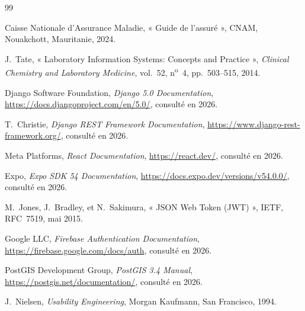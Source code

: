 \documentclass[12pt, a4paper, oneside]{report}
\begin{document}
\begin{thebibliography}{99}

  Caisse Nationale d'Assurance Maladie, « Guide de l'assuré », CNAM,
  Nouakchott, Mauritanie, 2024.

  J.\ Tate, « Laboratory Information Systems: Concepts and Practice »,
  \emph{Clinical Chemistry and Laboratory Medicine}, vol.~52, n\textsuperscript{o}~4,
  pp.~503--515, 2014.

  Django Software Foundation, \emph{Django 5.0 Documentation},
  \url{https://docs.djangoproject.com/en/5.0/}, consulté en 2026.

  T.\ Christie, \emph{Django REST Framework Documentation},
  \url{https://www.django-rest-framework.org/}, consulté en 2026.

  Meta Platforms, \emph{React Documentation}, \url{https://react.dev/},
  consulté en 2026.

  Expo, \emph{Expo SDK 54 Documentation},
  \url{https://docs.expo.dev/versions/v54.0.0/}, consulté en 2026.

  M.\ Jones, J.\ Bradley, et N.\ Sakimura, « JSON Web Token (JWT) »,
  IETF, RFC~7519, mai 2015.

  Google LLC, \emph{Firebase Authentication Documentation},
  \url{https://firebase.google.com/docs/auth}, consulté en 2026.

  PostGIS Development Group, \emph{PostGIS 3.4 Manual},
  \url{https://postgis.net/documentation/}, consulté en 2026.

  J.\ Nielsen, \emph{Usability Engineering}, Morgan Kaufmann, San
  Francisco, 1994.

\end{thebibliography}
\end{document}

